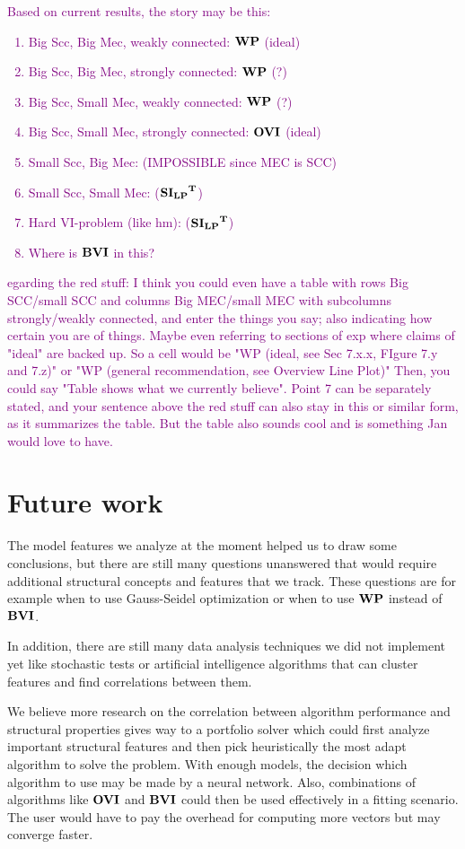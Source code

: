 \textcolor{purple}{
    Based on current results, the story may be this:
    \begin{enumerate}
        \item Big Scc, Big Mec, weakly connected: $\mathbf{WP}$ (ideal)
        \item Big Scc, Big Mec, strongly connected: $\mathbf{WP}$ (?)
        \item Big Scc, Small Mec, weakly connected: $\mathbf{WP}$ (?)
        \item Big Scc, Small Mec, strongly connected: $\mathbf{OVI}$ (ideal)
        \item Small Scc, Big Mec: (IMPOSSIBLE since MEC is SCC)
        \item Small Scc, Small Mec: ($\mathbf{\mathbf{SI_{LP}}^T}$)
        \item Hard VI-problem (like hm): ($\mathbf{\mathbf{SI_{LP}}^T}$)
        \item Where is $\mathbf{BVI}$ in this? 
    \end{enumerate}
}

\textcolor{purple}{egarding the red stuff: I think you could even have a table with rows Big SCC/small SCC and columns Big MEC/small MEC with subcolumns strongly/weakly connected, and enter the things you say; also indicating how certain you are of things. Maybe even referring to sections of exp where claims of "ideal" are backed up. So a cell would be "WP (ideal, see Sec 7.x.x, FIgure 7.y and 7.z)" or "WP (general recommendation, see Overview Line Plot)"
Then, you could say "Table shows what we currently believe". Point 7 can be separately stated, and your sentence above the red stuff can also stay in this or similar form, as it summarizes the table. But the table also sounds cool and is something Jan would love to have.}

\section*{Future work}
The model features we analyze at the moment helped us to draw some conclusions, but there are still many questions unanswered that would require
additional structural concepts and features that we track.
These questions are for example when to use Gauss-Seidel optimization or when to use $\mathbf{WP}$ instead of $\mathbf{BVI}$.

In addition, there are still many data analysis techniques we did not implement yet like stochastic tests or artificial intelligence algorithms
that can cluster features and find correlations between them. 

We believe more research on the correlation between algorithm performance and structural properties gives way to a portfolio solver which could first
analyze important structural features and then pick heuristically the most adapt algorithm to solve the problem.
With enough models, the decision which algorithm to use may be made by a neural network.
Also, combinations of algorithms like $\mathbf{OVI}$ and $\mathbf{BVI}$ could then be used effectively in a fitting scenario.
The user would have to pay the overhead for computing more vectors but may converge faster.

